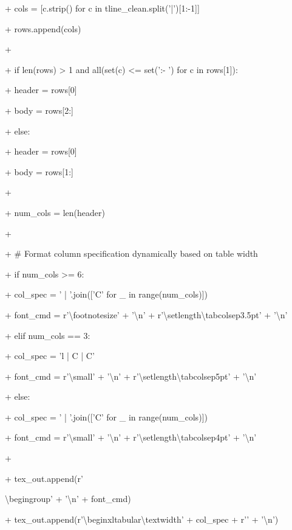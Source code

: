 \documentclass[11pt,a4paper]{article}
\begin{document}
\begin{itemize}
+                        cols = [c.strip() for c in tline\_clean.split('|')[1:-1]]

+                        rows.append(cols)

+

+                    if len(rows) > 1 and all(set(c) <= set(':- ') for c in rows[1]):

+                        header = rows[0]

+                        body = rows[2:]

+                    else:

+                        header = rows[0]

+                        body = rows[1:]

+

+                    num\_cols = len(header)

+

+                    \# Format column specification dynamically based on table width

+                    if num\_cols >= 6:

+                        col\_spec = ' | '.join(['C' for \_ in range(num\_cols)])

+                        font\_cmd = r'\textbackslash{}footnotesize' + '\textbackslash{}n' + r'\textbackslash{}setlength{\textbackslash{}tabcolsep}{3.5pt}' + '\textbackslash{}n'

+                    elif num\_cols == 3:

+                        col\_spec = 'l | C | C'

+                        font\_cmd = r'\textbackslash{}small' + '\textbackslash{}n' + r'\textbackslash{}setlength{\textbackslash{}tabcolsep}{5pt}' + '\textbackslash{}n'

+                    else:

+                        col\_spec = ' | '.join(['C' for \_ in range(num\_cols)])

+                        font\_cmd = r'\textbackslash{}small' + '\textbackslash{}n' + r'\textbackslash{}setlength{\textbackslash{}tabcolsep}{4pt}' + '\textbackslash{}n'

+

+                    tex\_out.append(r'{\textbackslash{}begingroup' + '\textbackslash{}n' + font\_cmd)

+                    tex\_out.append(r'\textbackslash{}begin{xltabular}{\textbackslash{}textwidth}{' + col\_spec + r'}' + '\textbackslash{}n')

}
\end{itemize}
\end{document}
